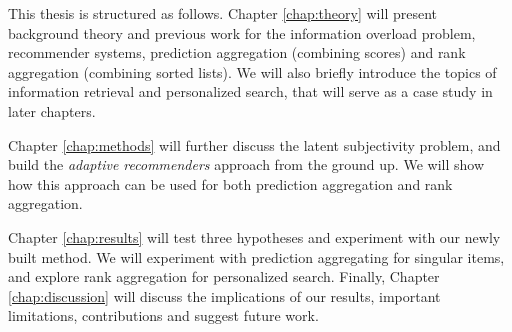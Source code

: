 \hr

\noindent
This thesis is structured as follows.
Chapter \ref{chap:theory} will present background theory and previous work for
the information overload problem, recommender systems, 
prediction aggregation (combining scores) and rank aggregation (combining sorted lists). 
We will also briefly introduce the topics of information
retrieval and personalized search, that will serve
as a case study in later chapters.

Chapter \ref{chap:methods} will further discuss the latent subjectivity problem,
and build the \emph{adaptive recommenders} approach from the ground up.
We will show how this approach can be used for both prediction aggregation
and rank aggregation.

Chapter \ref{chap:results} will test three hypotheses and experiment with our newly built method.
We will experiment with prediction aggregating for singular items, and explore rank aggregation for personalized search.
Finally, Chapter \ref{chap:discussion} will discuss the implications of our results,
important limitations, contributions and suggest future work.

